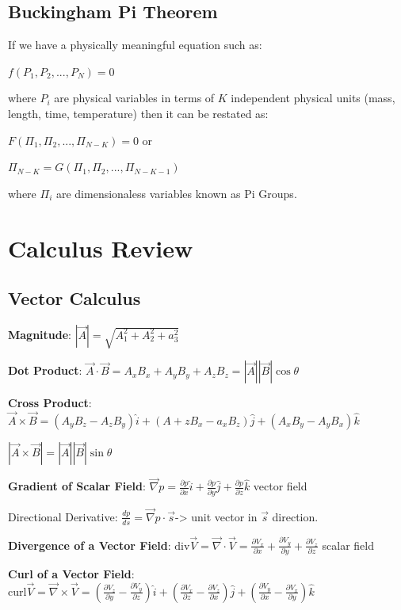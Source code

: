 \documentclass{article}
\begin{document}
\begin{multicols*}{2}
\subsection*{Buckingham Pi Theorem}
If we have a physically meaningful equation such as:\par
$f(P_1,P_2,...,P_N) = 0$\par
where $P_i$ are physical variables in terms of $K$ independent physical units (mass, length, time, temperature) then it can be restated as:\par 
$F(\Pi_1,\Pi_2,...,\Pi_{N-K}) = 0$ or\par $\Pi_{N-K}=G(\Pi_1,\Pi_2,...,\Pi_{N-K-1})$\par 
where ${\Pi_i}$ are dimensionaless variables known as Pi Groups.

\section*{Calculus Review}
\subsection*{Vector Calculus}
\textbf{Magnitude}: $|\vec{A}|=\sqrt{A_1^2+A_2^2+a_3^2}$\par 
\textbf{Dot Product}: $\vec{A}\cdot\vec{B}=A_xB_x+A_yB_y+A_zB_z=|\vec{A}||\vec{B}|\cos{\theta}$\par 
\textbf{Cross Product}:$\vec{A}\times\vec{B}=(A_yB_z-A_zB_y)\hat{i}+(A+zB_x-a_xB_z)\hat{j}+(A_xB_y-A_yB_x)\hat{k}$\par
$|\vec{A}\times\vec{B}|=|\vec{A}||\vec{B}|\sin{\theta}$\par 
\textbf{Gradient of Scalar Field}: $\vec{\nabla}p=\frac{\partial p}{\partial x}\hat{i}+\frac{\partial p}{\partial y}\hat{j}+\frac{\partial p}{\partial z}\hat{k}$ vector field\par 
Directional Derivative: $\frac{dp}{ds}=\vec{\nabla}p\cdot\vec{s}$-> unit vector in $\vec{s}$ direction.\par 
\textbf{Divergence of a Vector Field}: $\text{div}\vec{V}=\vec{\nabla}\cdot\vec{V}=\frac{\partial V_x}{\partial x}+\frac{\partial V_y}{\partial y}+\frac{\partial V_z}{\partial z}$ scalar field\par 
\textbf{Curl of a Vector Field}: $\text{curl}\vec{V}=\vec{\nabla}\times\vec{V}=(\frac{\partial V_z}{\partial y}-\frac{\partial V_y}{\partial z})\hat{i}
+(\frac{\partial V_x}{\partial z}-\frac{\partial V_z}{\partial x})\hat{j}
+(\frac{\partial V_y}{\partial x}-\frac{\partial V_x}{\partial y})\hat{k}$\par 

\end{multicols*}
\end{document}
